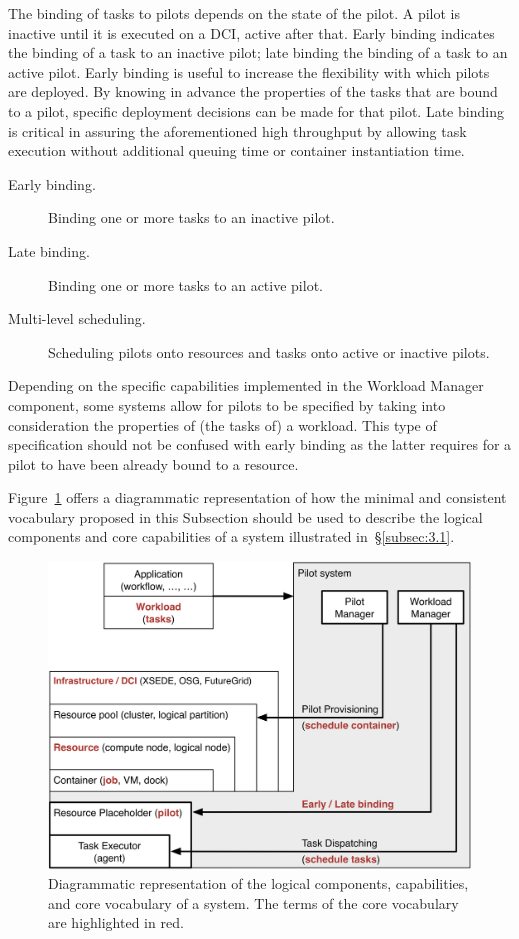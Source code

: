 \documentclass{sig-alternate}
\begin{document}
The binding of tasks to pilots depends on the state of the pilot. A
pilot is inactive until it is executed on a DCI, active after that.
Early binding indicates the binding of a task to an inactive pilot; late
binding the binding of a task to an active pilot. Early binding is
useful to increase the flexibility with which pilots are deployed. By
knowing in advance the properties of the tasks that are bound to a
pilot, specific deployment decisions can be made for that pilot.
Late binding is critical in assuring the aforementioned high throughput by
allowing task execution without additional queuing time or container
instantiation time.

\begin{description}

\item[Early binding.] Binding one or more tasks to an inactive pilot.

\item[Late binding.] Binding one or more tasks to an active pilot.

\item[Multi-level scheduling.] Scheduling pilots onto resources and
tasks onto active or inactive pilots.

\end{description}

Depending on the specific capabilities implemented in the Workload
Manager component, some \pilot systems allow for pilots to be
specified by taking into consideration the properties of (the tasks of) a
workload. This type of specification should not be confused with early
binding as the latter requires for a pilot to have been already
bound to a resource.

Figure~\ref{fig:core_vocabulary} offers a diagrammatic representation of
how the minimal and consistent vocabulary proposed in this Subsection
should be used to describe the logical components and core capabilities
of a \pilot system illustrated in~\S\ref{subsec:3.1}.

\begin{figure}[t]
    \centering
        \includegraphics[width=.48\textwidth]{figures/core_vocabulary.png}
    \caption{Diagrammatic representation of the logical components,
             capabilities, and core vocabulary of a \pilot system.
             The terms of the core vocabulary are highlighted in red.}
    \label{fig:core_vocabulary}
\end{figure}
\end{document}
